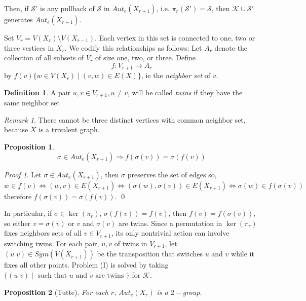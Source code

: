 \documentclass[12pt,a4paper]{book}
\theoremstyle{plain}
\newtheorem{proposition}{Proposition}
\theoremstyle{definition}
\newtheorem{definition}{Definition}
\theoremstyle{remark}
\newtheorem{observation}{Remark}
\newtheorem*{Proof}{Proof}
\begin{document}
Then, if $\mathcal{S}'$ is any pullback of $\mathcal{S}$ in $Aut_e(X_{r+1})$, i.e. $\pi_r(\mathcal{S}') = \mathcal{S}$, then  $\mathcal{K} \cup \mathcal{S}'$ generates
 $Aut_e(X_{r+1})$.

Set $V_r = V(X_r) \setminus V(X_{r-1})$. Each vertex in this set is connected to one, two or three vertices in $X_r$. We codify this relationships 
as follows: Let $A_r$ denote the collection of all subsets of $V_r$ of size one, two, or three. Define
\[
 f: V_{r+1} \rightarrow A_r
\]
by $f(v) \{ w \in V(X_r) \; | \; (v,w) \in E(X) \}$, ie the \emph{neighbor set} of $v$.
 
\begin{definition}
 A pair $u,v \in V_{r+1}, u \neq v$, will be called \emph{twins} if they have the same neighbor set
\end{definition}

\begin{observation}
 There cannot be three distinct vertices with common neighbor set, because $X$ is a trivalent graph.
\end{observation}

\begin{proposition}
 \[
  \sigma \in Aut_e(X_{r+1}) \Rightarrow f( \sigma (v)) = \sigma ( f(v))
 \]

\end{proposition}

\begin{Proof}
Let $\sigma \in Aut_e(X_{r+1})$, then $\sigma$ preserves the set of edges so,
\[
w \in f(v) \Leftrightarrow ( w,v) \in E(X_{r+1}) \Leftrightarrow ( \sigma(w) , \sigma(v) ) \in E(X_{r+1}) 
\Leftrightarrow \sigma(w) \in f( \sigma (v))
\]
therefore $f(\sigma(v) ) = \sigma(f(v))$.
\qed  \end{Proof}  

In particular, if $\sigma \in \ker( \pi_r)$, $\sigma ( f(v)) = f(v)$, then $f(v) = f( \sigma (v))$, so either $v = \sigma (v)$ or $v$ 
and $\sigma(v)$ are twins. Since a permutation in $\ker( \pi_r)$ fixes neighbors sets of all $v \in V_{r+1}$, its only nontrivial action 
can involve switching twins. For each pair, $u,v$ of twins in $V_{r+1}$, let $(u \; v ) \in Sym (V( X_{r+1}))$ be the transposition that 
switches $u$ and $v$ while it fixes all other points. Problem (I) is solved by taking $\{ (u \; v ) \; | \; \mbox{ such that } u \mbox{ and } 
v \mbox{ are twins } \}$ for $\mathcal{K}$.

\begin{proposition}[Tutte]\label{Tutte}
 For each $r$, $Aut_e(X_r)$ is a $2-$group.
\end{proposition}
\end{document}
